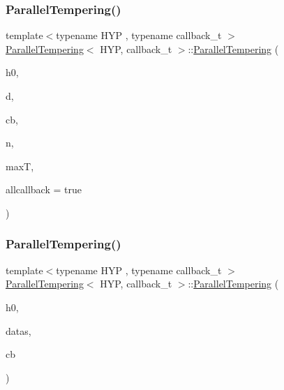 \mbox{\label{class_parallel_tempering_a6318b222a7fbc7148ce82d0bbc5a3ecd}} 
\subsubsection{\texorpdfstring{Parallel\+Tempering()}{ParallelTempering()}\hspace{0.1cm}{\footnotesize\ttfamily [2/3]}}
{\footnotesize\ttfamily template$<$typename H\+YP , typename callback\+\_\+t $>$ \\
\hyperlink{class_parallel_tempering}{Parallel\+Tempering}$<$ H\+YP, callback\+\_\+t $>$\+::\hyperlink{class_parallel_tempering}{Parallel\+Tempering} (\begin{DoxyParamCaption}\item[{H\+YP \&}]{h0,  }\item[{typename H\+Y\+P\+::t\+\_\+data $\ast$}]{d,  }\item[{callback\+\_\+t \&}]{cb,  }\item[{unsigned long}]{n,  }\item[{double}]{maxT,  }\item[{bool}]{allcallback = {\ttfamily true} }\end{DoxyParamCaption})\hspace{0.3cm}{\ttfamily [inline]}}

\mbox{\label{class_parallel_tempering_ad4b72862bcc821fe725ac2248c150898}} 
\subsubsection{\texorpdfstring{Parallel\+Tempering()}{ParallelTempering()}\hspace{0.1cm}{\footnotesize\ttfamily [3/3]}}
{\footnotesize\ttfamily template$<$typename H\+YP , typename callback\+\_\+t $>$ \\
\hyperlink{class_parallel_tempering}{Parallel\+Tempering}$<$ H\+YP, callback\+\_\+t $>$\+::\hyperlink{class_parallel_tempering}{Parallel\+Tempering} (\begin{DoxyParamCaption}\item[{H\+YP \&}]{h0,  }\item[{std\+::vector$<$ typename H\+Y\+P\+::t\+\_\+data $>$ \&}]{datas,  }\item[{std\+::vector$<$ callback\+\_\+t $>$ \&}]{cb }\end{DoxyParamCaption})\hspace{0.3cm}{\ttfamily [inline]}}

